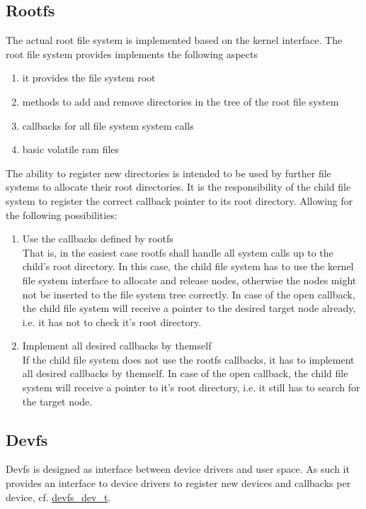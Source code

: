	\subsection{Rootfs}
		The actual root file system is implemented based on the kernel interface. The root file system provides implements the following aspects
		\begin{enumerate}
			\item it provides the file system root
			\item methods to add and remove directories in the tree of the root file system
			\item callbacks for all file system system calls
			\item basic volatile ram files
		\end{enumerate}

		The ability to register new directories is intended to be used by further file systems to allocate their root directories. It is the responsibility of the child file system to register the correct callback pointer to its root directory. Allowing for the following possibilities:
		\begin{enumerate}
			\item Use the callbacks defined by rootfs\\
				That is, in the easiest case rootfs shall handle all system calls up to the child's root directory. In this case, the child file system has to use the kernel file system interface to allocate and release nodes, otherwise the nodes might not be inserted to the file system tree correctly.
				In case of the open callback, the child file system will receive a pointer to the desired target node already, i.e. it has not to check it's root directory.

			\item Implement all desired callbacks by themself\\
				 If the child file system does not use the rootfs callbacks, it has to implement all desired callbacks by themself.
				 In case of the open callback, the child file system will receive a pointer to it's root directory, i.e. it still has to search for the target node.
		\end{enumerate}
		
	\subsection{Devfs}
		Devfs is designed as interface between device drivers and user space. As such it provides an interface to device drivers to register new devices and callbacks per device, cf. \hyperref[structdevfs__dev__t]{devfs\_dev\_t}.
